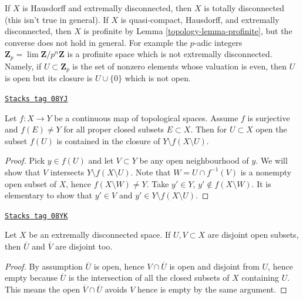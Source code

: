 If $X$ is Hausdorff and extremally disconnected, then $X$ is totally
disconnected (this isn't true in general). If $X$ is quasi-compact,
Hausdorff, and extremally disconnected, then $X$ is profinite by
Lemma \ref{topology-lemma-profinite}, but the converse does not hold in general.
For example the $p$-adic integers
$\mathbf{Z}_p = \lim \mathbf{Z}/p^n\mathbf{Z}$ is a profinite space
which is not extremally disconnected. Namely, if $U \subset \mathbf{Z}_p$
is the set of nonzero elements whose valuation is even, then $U$ is open
but its closure is $U \cup \{0\}$ which is not open.

\begin{lemma}
\label{topology-lemma-image-open-technical}
\href{https://stacks.math.columbia.edu/tag/08YJ}{\texttt{Stacks tag 08YJ}}

Let $f : X \to Y$ be a continuous map of topological spaces.
Assume $f$ is surjective and $f(E) \not = Y$ for all proper
closed subsets $E \subset X$. Then for $U \subset X$ open the subset
$f(U)$ is contained in the closure of $Y \setminus f(X \setminus U)$.
\end{lemma}

\begin{proof}
Pick $y \in f(U)$ and let $V \subset Y$ be any open neighbourhood of $y$.
We will show that $V$ intersects $Y \setminus f(X \setminus U)$.
Note that $W = U \cap f^{-1}(V)$ is a nonempty open subset of $X$, hence
$f(X \setminus W) \not = Y$. Take $y' \in Y$, $y' \not \in f(X \setminus W)$.
It is elementary to show that $y' \in V$ and
$y' \in Y \setminus f(X \setminus U)$.
\end{proof}

\begin{lemma}
\label{topology-lemma-intersection-empty}
\href{https://stacks.math.columbia.edu/tag/08YK}{\texttt{Stacks tag 08YK}}

Let $X$ be an extremally disconnected space.
If $U, V \subset X$ are disjoint open subsets, then
$\overline{U}$ and $\overline{V}$ are disjoint too.
\end{lemma}

\begin{proof}
By assumption $\overline{U}$ is open, hence $V \cap \overline{U}$
is open and disjoint from $U$, hence empty because $\overline{U}$
is the intersection of all the closed subsets of $X$ containing $U$.
This means the open $\overline{V} \cap \overline{U}$ avoids $V$
hence is empty by the same argument.
\end{proof}

